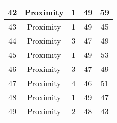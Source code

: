 \documentclass[results.tex]{subfiles}
\begin{document}
\begin{center}
\begin{tabular}{| c || c | c | c | c |}
            \hline
            42                      & Proximity                    & 1                      & 49                      & 59                   \\
            \hline
            43                      & Proximity                    & 1                      & 49                      & 45                   \\
            \hline
            44                      & Proximity                    & 3                      & 47                      & 49                   \\
            \hline
            45                      & Proximity                    & 1                      & 49                      & 53                   \\
            \hline
            46                      & Proximity                    & 3                      & 47                      & 49                   \\
            \hline
            47                      & Proximity                    & 4                      & 46                      & 51                   \\
            \hline
            48                      & Proximity                    & 1                      & 49                      & 47                   \\
            \hline
            49                      & Proximity                    & 2                      & 48                      & 43                   \\
            \hline
        \end{tabular}
    \end{center}
\end{document}
